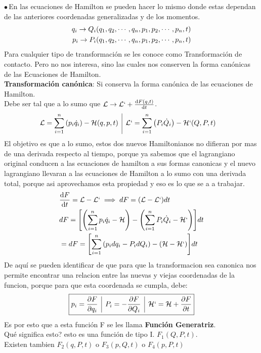 \documentclass[12pt]{article}
\newcommand{\en}[1]{\[\boxed{#1}\]}
\newcommand{\mc}[1]{\mathcal{#1}}
\newcommand{\sumn}[1]{\sum_{#1 =1}^{n}}
\newcommand{\xn}[1]{{#1}_{1},{#1}_{2},\cdots,{#1}_{n}}
\newcommand{\pua}{$\bullet \, $}
\newcommand{\rojo}[1]{{\color{rojo}#1}}
\newcommand{\rosa}[1]{{\color{fucsia}#1}}
\begin{document}
\pua En las ecuaciones de Hamilton se pueden hacer lo mismo donde estas dependan de las anteriores coordenadas generalizadas y de los momentos.
\begin{align}
q_i \rightarrow Q_i\qty(\xn{q},\xn{p},t)\\
p_i \rightarrow P_i\qty(\xn{q},\xn{p},t)	
\end{align}
\rosa{Para cualquier tipo de transformación se les conoce como Transformación de contacto}. Pero no nos interesa, sino las cuales nos conserven la forma canónicas de las Ecuaciones de Hamilton.\\
\textbf{Transformación canónica}: Si conserva la forma canónica de las ecuaciones de Hamilton.\\
Debe ser tal que a lo sumo que $\mc{L} \rightarrow \mc{L}` + \dv{F(q,t)}{t}$.
\begin{align}
&\mc{L}= \sumn{i} \qty(p_i \dot{q}_i) - \mc{H} (q,p,t)\,\,\,\vline \,\,\, \mc{L}`= \sumn{i}	\qty(P_i \dot{Q}_i) - \mc{H}` (Q,P,t)
\end{align}
El objetivo es que a lo sumo, estos dos nuevos Hamiltonianos no difieran por mas de una derivada respecto al tiempo, porque ya sabemos que el lagrangiano original conducen a las ecuaciones de hamilton a sus formas canonicas y el nuevo lagrangiano llevaran a las ecuaciones de Hamilton a lo sumo con una derivada total, porque asi aprovechamos esta propiedad y eso es lo que se a a trabajar.
\begin{align}
&\dv{F}{t}= \mc{L}-\mc{L}` \implies dF= \qty(\mc{L}-\mc{L}`)dt\\
&dF= \qty[\qty(\sumn{i} p_i \dot{q}_i - \mc{H})- \qty(\sumn{i} P_i \dot{Q}_i - \mc{H}`)]	dt\\
&=dF=\qty[\sumn{i} \qty(p_i dq_i - P_i dQ_i)- \qty(\mc{H}-\mc{H}`)]dt\\
\end{align}
De aquí se pueden identificar de que para que la transformacion sea canonica nos permite encontrar una relacion entre las nuevas y viejas coordenadas de la funcion, porque para que esta coordenada se cumpla, debe:
\rojo{\en{p_i=\pdv{F}{q_i}\,\,\,\vline\,\,\, P_i=-\pdv{F}{Q_i}\,\,\,\vline \,\,\, \mc{H}`=\mc{H}+ \pdv{F}{t}}}
Es por esto que a esta función F se les llama \textbf{Función Generatriz}.\\
Qué significa esto? esto es una función de tipo I. $F_1 (Q,P,t)$.\\
Existen tambien $F_2 (q,P,t)$ o $F_3(p,Q,t)$ o $F_4(p,P,t)$
\end{document}
